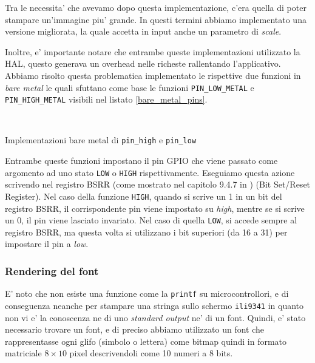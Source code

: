 \documentclass[a4paper]{article}
\begin{document}
Tra le necessita' che avevamo dopo questa implementazione, c'era quella di poter stampare un'immagine piu' grande. In questi termini abbiamo implementato una versione migliorata, la quale accetta in input anche un parametro di \textit{scale}.

Inoltre, e' importante notare che entrambe queste implementazioni utilizzato la HAL, questo generava un overhead nelle richeste rallentando l'applicativo. Abbiamo risolto questa problematica implementato le rispettive due funzioni in \textit{bare metal} le quali sfuttano come base le funzioni \texttt{PIN\_LOW\_METAL} e \texttt{PIN\_HIGH\_METAL} visibili nel listato \ref{bare_metal_pins}.

\begin{Listing}
    \centering
    \mbox{
        \quad
    }
    \caption{Implementazioni bare metal di \texttt{pin\_high} e \texttt{pin\_low}}
    \label{bare_metal_pins}
\end{Listing}

Entrambe queste funzioni impostano il pin GPIO che viene passato come argomento ad uno stato \texttt{LOW} o \texttt{HIGH} rispettivamente.  Eseguiamo questa azione scrivendo nel registro BSRR (come mostrato nel capitolo 9.4.7 in \cite{STM32F334xx}) (Bit Set/Reset Register). Nel caso della funzione \texttt{HIGH}, quando si scrive un 1 in un bit del registro BSRR, il corrispondente pin viene impostato su \textit{high}, mentre se si scrive un 0, il pin viene lasciato invariato. Nel caso di quella \texttt{LOW}, si accede sempre al registro BSRR, ma questa volta si utilizzano i bit superiori (da 16 a 31) per impostare il pin a \textit{low}.

\subsubsection{Rendering del font}

E' noto che non esiste una funzione come la \texttt{printf} su microcontrollori, e di conseguenza neanche per stampare una stringa sullo schermo \texttt{ili9341} in quanto non vi e' la conoscenza ne di uno \textit{standard output} ne' di un font. Quindi, e' stato necessario trovare un font, e di preciso abbiamo utilizzato un font che rappresentasse ogni glifo (simbolo o lettera) come bitmap quindi in formato matriciale $8 \times 10$ pixel descrivendoli come 10 numeri a 8 bits.
\end{document}
